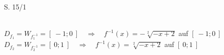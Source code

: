 \begin{Exercise}{S. 15/1}{}
\begin{enumerate}
\begin{enumerate}[label=\alph*)]
{\begin{itemize}[leftmargin=*]
{
                        }\\[3.0ex]
                        $D_{f_{1}} = W_{f_{1}^{-1}} = \left[ \ -1; 0 \ \right] \quad \Rightarrow \quad f^{-1}(x) = -\sqrt[2]{-x + 2}$ \quad auf \quad $\left[ \ -1; 0 \ \right]$\\[2.0ex]
                        $D_{f_{2}} = W_{f_{2}^{-1}} = \left[ \ 0; 1 \ \right] \quad \Rightarrow \quad f^{-1}(x) = \sqrt[2]{-x + 2}$ \quad auf \quad $\left[ \ 0; 1 \ \right]$
                \end{itemize}
            }
        \end{enumerate}
    \end{enumerate}
\end{Exercise}

